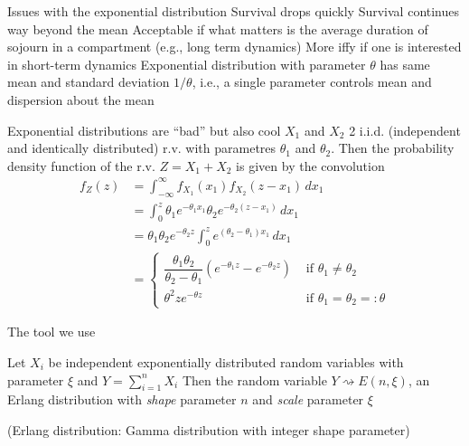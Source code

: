 \documentclass[aspectratio=169]{beamer}
\begin{document}
\begin{frame}{Issues with the exponential distribution}
\bbullet Survival drops quickly
\vfill
\bbullet Survival continues way beyond the mean
\vfill
Acceptable if what matters is the average duration of sojourn in a compartment (e.g., long term dynamics)
\vfill
More iffy if one is interested in short-term dynamics
\vfill
\bbullet Exponential distribution with parameter $\theta$ has same mean and standard deviation $1/\theta$, i.e., a single parameter controls mean and dispersion about the mean
\end{frame}

\begin{frame}{Exponential distributions are ``bad'' but also cool}
$X_1$ and $X_2$ 2 i.i.d. (independent and identically distributed) r.v. with parametres $\theta_1$ and $\theta_2$. Then the probability density function of the r.v. $Z=X_1+X_2$ is given by the convolution
\begin{align}
 f_Z(z) &= \int_{-\infty}^\infty f_{X_1}(x_1) f_{X_2}(z - x_1)\,dx_1 \nonumber\\
   &= \int_0^z \theta_1 e^{-\theta_1 x_1} \theta_2 e^{-\theta_2(z - x_1)} \, dx_1 \nonumber\\
   &= \theta_1 \theta_2 e^{-\theta_2 z} \int_0^z e^{(\theta_2 - \theta_1)x_1}\,dx_1 \nonumber\\
   &= \begin{cases}
        \dfrac{\theta_1 \theta_2}{\theta_2-\theta_1} \left(e^{-\theta_1 z} - e^{-\theta_2 z}\right) & \text{ if } \theta_1 \neq \theta_2 \\
        \theta^2 z e^{-\theta z} & \text{ if } \theta_1 = \theta_2 =: \theta
      \end{cases}
\end{align}
\end{frame}

\begin{frame}{The tool we use}
\begin{theorem}
Let $X_i$ be independent exponentially distributed random variables with parameter $\xi$ and $Y = \sum_{i=1}^n X_i$
\vskip1cm
Then the random variable $Y\rightsquigarrow E(n,\xi)$, an Erlang distribution with \emph{shape} parameter $n$ and \emph{scale} parameter $\xi$
\end{theorem}
\vfill
(Erlang distribution: Gamma distribution with integer shape parameter)
\end{frame}
\end{document}
